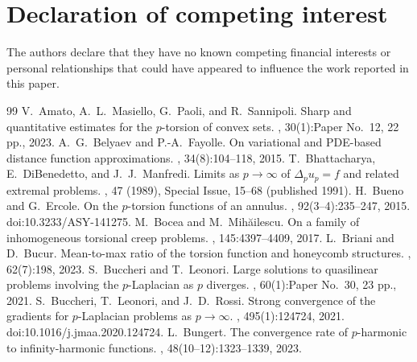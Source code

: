 \documentclass[11pt]{article}
\theoremstyle{definition}
\theoremstyle{remark}
\begin{document}

\section*{Declaration of competing interest}
The authors declare that they have no known competing financial interests or
personal relationships that could have appeared to influence the work reported
in this paper.
 

\begin{thebibliography}{99}
 V.\ Amato, A.\ L.\ Masiello, G.\ Paoli, and R.\ Sannipoli.
\newblock Sharp and quantitative estimates for the $p$-torsion of convex sets.
, 30(1):Paper No.\ 12, 22 pp., 2023.
 A.\ G.\ Belyaev and P.-A.\ Fayolle.
\newblock On variational and PDE-based distance function approximations.
, 34(8):104--118, 2015.
 T.\ Bhattacharya, E.\ DiBenedetto, and J.\ J.\ Manfredi.
\newblock Limits as $p\to\infty$ of $\Delta_p u_p = f$ and related extremal problems.
, 47 (1989), Special Issue, 15--68 (published 1991).
 H.\ Bueno and G.\ Ercole.
\newblock On the $p$-torsion functions of an annulus.
, 92(3--4):235--247, 2015.
\newblock doi:10.3233/ASY-141275.
 M.\ Bocea and M.\ Mih\u{a}ilescu.
\newblock On a family of inhomogeneous torsional creep problems.
, 145:4397--4409, 2017.
 L.\ Briani and D.\ Bucur.
\newblock Mean-to-max ratio of the torsion function and honeycomb structures.
, 62(7):198, 2023.
 S.\ Buccheri and T.\ Leonori.
\newblock Large solutions to quasilinear problems involving the $p$-Laplacian as $p$ diverges.
, 60(1):Paper No.\ 30, 23 pp., 2021.
 S.\ Buccheri, T.\ Leonori, and J.\ D.\ Rossi.
\newblock Strong convergence of the gradients for $p$-Laplacian problems as $p\to\infty$.
, 495(1):124724, 2021.
\newblock doi:10.1016/j.jmaa.2020.124724.
 L.\ Bungert.
\newblock The convergence rate of $p$-harmonic to infinity-harmonic functions.
, 48(10--12):1323--1339, 2023.

\end{thebibliography}
\end{document}
